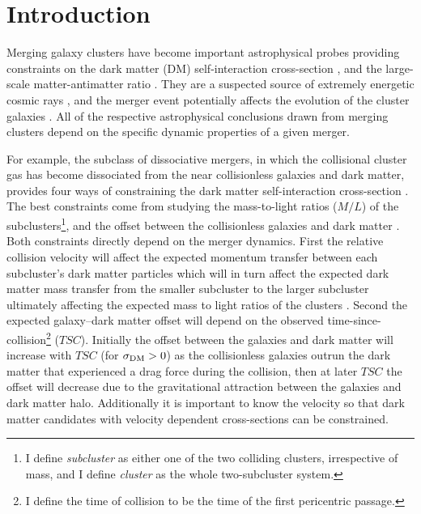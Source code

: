 
\section{Introduction}\label{sec_intro}
Merging galaxy clusters have become important astrophysical probes providing constraints on the dark matter (DM) self-interaction cross-section \citep[$\sigma_{\rm DM}$;][]{Markevitch:2004dl, Randall:2008hs, Merten:2011gu, Dawson:2012dl}, and the large-scale matter-antimatter ratio \citep{Steigman:2008dy}.
They are a suspected source of extremely energetic cosmic rays \citep{vanWeeren:2010dn}, and the merger event potentially affects the evolution of the cluster galaxies \citep[e.g.][]{Poggianti:2004ca,Hwang:2009ip,Chung:2009bz}.
All of the respective astrophysical conclusions drawn from merging clusters depend on the specific dynamic properties of a given merger.


For example, the subclass of dissociative mergers, in which the collisional cluster gas has become dissociated from the near collisionless galaxies and dark matter,  provides four ways of constraining the dark matter self-interaction cross-section \citep{Markevitch:2004dl,Randall:2008hs}.
The best constraints come from studying the mass-to-light ratios ($M/L$) of the subclusters\footnote{I define \emph{subcluster} as either one of the two colliding clusters, irrespective of mass, and I define \emph{cluster} as the whole two-subcluster system.}, and the offset between the collisionless galaxies and dark matter \citep{Markevitch:2004dl,Randall:2008hs}.
Both constraints directly depend on the merger dynamics.
First the relative collision velocity will affect the expected momentum transfer between each subcluster's dark matter particles which will in turn affect the expected dark matter mass transfer from the smaller subcluster to the larger subcluster ultimately affecting the expected mass to light ratios of the clusters \citep{Markevitch:2004dl}.
Second the expected galaxy--dark matter offset will depend on the observed time-since-collision\footnote{I define the time of collision to be the time of the first pericentric passage.} ($TSC$).
Initially the offset between the galaxies and dark matter will increase with $TSC$ (for $\sigma_{\rm DM} > 0$) as the collisionless galaxies outrun the dark matter that experienced a drag force during the collision, then at later $TSC$ the offset will decrease due to the gravitational attraction between the galaxies and dark matter halo. 
Additionally it is important to know the velocity so that dark matter candidates with velocity dependent cross-sections \citep[e.g.][]{Colin:2002ku,Vogelsberger:2012dy} can be constrained.

